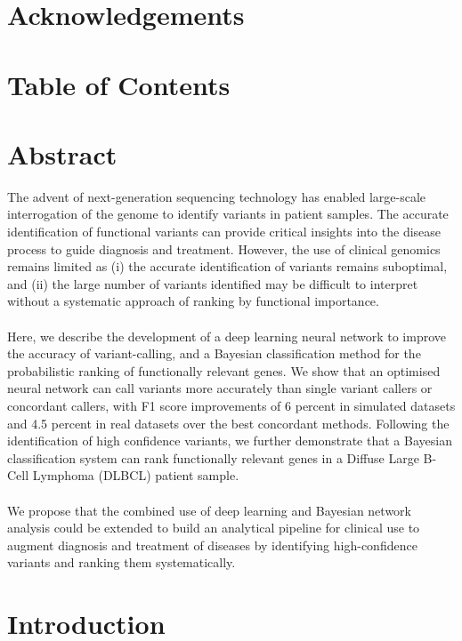 \documentclass{article}
\begin{document}
\section*{Acknowledgements}
\newpage
\section*{Table of Contents}
\small
\tableofcontents
\newpage
\doublespace
\normalsize
{} 
\section*{Abstract}
The advent of next-generation sequencing technology has enabled large-scale interrogation of the genome to identify variants in patient samples. The accurate identification of functional variants can provide critical insights into the disease process to guide diagnosis and treatment. However, the use of clinical genomics remains limited as (i) the accurate identification of variants remains suboptimal, and (ii) the large number of variants identified may be difficult to interpret without a systematic approach of ranking by functional importance.\\\\
Here, we describe the development of a deep learning neural network to improve the accuracy of variant-calling, and a Bayesian classification method for the probabilistic ranking of functionally relevant genes. We show that an optimised neural network can call variants more accurately than single variant callers or concordant callers, with F1 score improvements of 6 percent in simulated datasets and 4.5 percent in real datasets over the best concordant methods. Following the identification of high confidence variants, we further demonstrate that a Bayesian classification system can rank functionally relevant genes in a Diffuse Large B-Cell Lymphoma (DLBCL) patient sample.\\\\
We propose that the combined use of deep learning and Bayesian network analysis could be extended to build an analytical pipeline for clinical use to augment diagnosis and treatment of diseases by identifying high-confidence variants and ranking them systematically.
\newpage
\section{Introduction}
\end{document}
